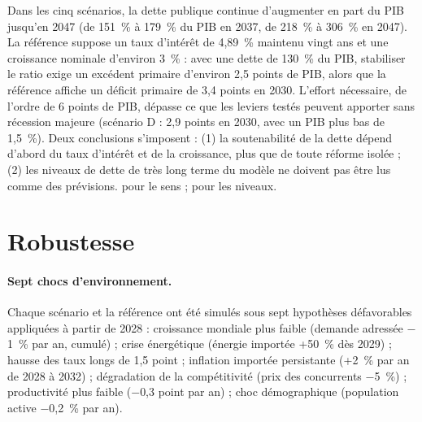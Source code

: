 \begin{resultat}
Dans les cinq scénarios, la dette publique continue d'augmenter en part du PIB jusqu'en 2047 (de 151~\% à 179~\% du PIB en
2037, de 218~\% à 306~\% en 2047). La référence suppose un taux d'intérêt de 4,89~\% maintenu vingt ans et une croissance
nominale d'environ 3~\% : avec une dette de 130~\% du PIB, stabiliser le ratio exige un excédent primaire d'environ
2,5 points de PIB, alors que la référence affiche un déficit primaire de 3,4 points en 2030. L'effort nécessaire, de
l'ordre de 6 points de PIB, dépasse ce que les leviers testés peuvent apporter sans récession majeure (scénario D :
2,9 points en 2030, avec un PIB plus bas de 1,5~\%). Deux conclusions s'imposent : (1) la soutenabilité de la dette
dépend d'abord du taux d'intérêt et de la croissance, plus que de toute réforme isolée ; (2) les niveaux de dette de très
long terme du modèle ne doivent pas être lus comme des prévisions.  pour le sens ;  pour les
niveaux.
\end{resultat}

\section{Robustesse}

\paragraph{Sept chocs d'environnement.} Chaque scénario et la référence ont été simulés sous sept hypothèses défavorables
appliquées à partir de 2028 : croissance mondiale plus faible (demande adressée $-$1~\% par an, cumulé) ; crise énergétique
(énergie importée +50~\% dès 2029) ; hausse des taux longs de 1,5 point ; inflation importée persistante (+2~\% par an de
2028 à 2032) ; dégradation de la compétitivité (prix des concurrents $-$5~\%) ; productivité plus faible ($-$0,3 point par
an) ; choc démographique (population active $-$0,2~\% par an).

\begin{table}[htbp]
\centering\scriptsize
\caption{Robustesse : écarts à la référence (soumise au même choc) en 2037. PIB en \%, dette en points de PIB.}
\label{tab:robustesse}
\end{table}

\begin{table}[htbp]
\centering\scriptsize
\caption{Niveau de la dette publique en 2037 (\% du PIB) selon les chocs.}
\label{tab:dettechocs}
\end{table}

